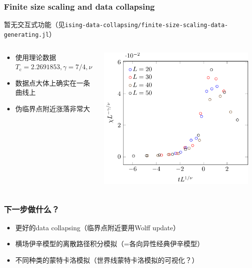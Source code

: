 \documentclass[UTF8]{ctexbeamer}
\begin{document}
\begin{frame}
\frametitle{Finite size scaling and data collapsing}

暂无交互式功能（见\texttt{ising-data-collapsing/finite-size-scaling-data-generating.jl}）

\begin{columns}

\begin{column}{0.5\textwidth}
    \begin{itemize}
        \item 使用理论数据$T_\text{c} = 2.2691853, \gamma = 7/4, \nu = 1$
        \item 数据点大体上确实在一条曲线上
        \item 伪临界点附近涨落非常大
    \end{itemize}
\end{column}

\begin{column}{0.5\textwidth}
    \includegraphics[width=\textwidth]{../ising-data-collapsing/ising-data-collapsing-run-1.pdf}
\end{column}

\end{columns}

\end{frame}

\begin{frame}
\frametitle{下一步做什么？}

\begin{itemize}
    \item 更好的data collapsing（临界点附近要用Wolff update）
    \item 横场伊辛模型的离散路径积分模拟（=各向异性经典伊辛模型）
    \item 不同种类的蒙特卡洛模拟（世界线蒙特卡洛模拟的可视化？）
\end{itemize}    

\end{frame}
\end{document}
